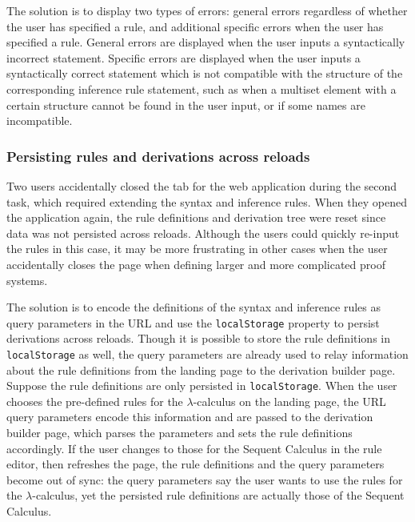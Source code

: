 The solution is to display two types of errors: general errors regardless of whether the user has specified a rule, and additional specific errors when the user has specified a rule. General errors are displayed when the user inputs a syntactically incorrect statement. Specific errors are displayed when the user inputs a syntactically correct statement which is not compatible with the structure of the corresponding inference rule statement, such as when a multiset element with a certain structure cannot be found in the user input, or if some names are incompatible.

\subsubsection{Persisting rules and derivations across reloads}
Two users accidentally closed the tab for the web application during the second task, which required extending the syntax and inference rules. When they opened the application again, the rule definitions and derivation tree were reset since data was not persisted across reloads. Although the users could quickly re-input the rules in this case, it may be more frustrating in other cases when the user accidentally closes the page when defining larger and more complicated proof systems.

The solution is to encode the definitions of the syntax and inference rules as query parameters in the URL and use the \lstinline{localStorage} property \cite{localstorage} to persist derivations across reloads. Though it is possible to store the rule definitions in \lstinline{localStorage} as well, the query parameters are already used to relay information about the rule definitions from the landing page to the derivation builder page. Suppose the rule definitions are only persisted in \lstinline{localStorage}. When the user chooses the pre-defined rules for the $\lambda$-calculus on the landing page, the URL query parameters encode this information and are passed to the derivation builder page, which parses the parameters and sets the rule definitions accordingly. If the user changes to those for the Sequent Calculus in the rule editor, then refreshes the page, the rule definitions and the query parameters become out of sync: the query parameters say the user wants to use the rules for the $\lambda$-calculus, yet the persisted rule definitions are actually those of the Sequent Calculus.
